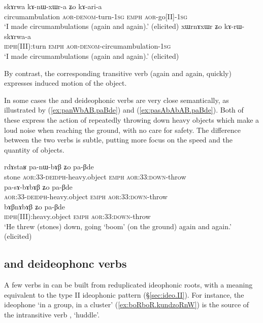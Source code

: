 \begin{exe}
\ex \label{ex:kAnWxWra}
\gll skɤrwa kɤ-nɯ-xɯr-a ʑo kɤ-ari-a \\
circumambulation \textsc{aor}-\textsc{denom}-turn-\textsc{1sg} \textsc{emph} \textsc{aor}-go[II]-\textsc{1sg} \\
\glt `I made circumambulations (again and again).' (elicited)
\ex \label{ex:xWrnAxWr}
\gll xɯrnɤxɯr ʑo kɤ-rɯ-skɤrwa-a \\
\textsc{idph}(III):turn \textsc{emph} \textsc{aor}-\textsc{denom}-circumambulation-\textsc{1sg} \\
\glt `I made circumambulations (again and again).' (elicited)
\end{exe}

By contrast, the corresponding transitive verb  (again and again, quickly) expresses induced motion of the object.
 
In some cases the  and  deideophonic verbs are very close semantically, as illustrated by  (\ref{ex:panWbAB.paBde}) and  (\ref{ex:pasAbAbAB.paBde}). Both of these express the action of repeatedly throwing down heavy objects which make a loud noise when reaching the ground, with no care for safety. The difference between the two verbs is subtle,  putting more focus on the speed and the quantity of objects.
 
\begin{exe}
\ex \label{ex:nWbAB.bABnAbAB}
\begin{xlist}
\ex \label{ex:panWbAB.paBde}
\gll rdɤstaʁ pa-nɯ-bɤβ ʑo pa-βde \\
stone \textsc{aor}:3\fl{}3-\textsc{deidph}-heavy.object \textsc{emph}  \textsc{aor}:3\fl{}3:\textsc{down}-throw \\
\ex \label{ex:pasAbAbAB.paBde}
\gll   pa-sɤ-bɤbɤβ ʑo pa-βde \\
  \textsc{aor}:3\fl{}3-\textsc{deidph}-heavy.object \textsc{emph}  \textsc{aor}:3\fl{}3:\textsc{down}-throw \\
\ex \label{ex:bABnAbAB.paBde}
\gll bɤβnɤbɤβ ʑo pa-βde \\
\textsc{idph}(III):heavy.object \textsc{emph}  \textsc{aor}:3\fl{}3:\textsc{down}-throw \\
\glt `He threw (stones) down, going `boom' (on the ground) again and again.' (elicited)
\end{xlist}
\end{exe}


\subsection{ and  deideophonc verbs} \label{sec:a.nA.deidph}
A few verbs in  can be built from reduplicated ideophonic roots, with a meaning equivalent to the type II ideophonic pattern (§\ref{sec:ideo.II}). For instance, the ideophone  `in a group, in a cluster'  (\ref{ex:boRboR.kundzoRnW}) is the source of the intransitive verb , `huddle'. 

